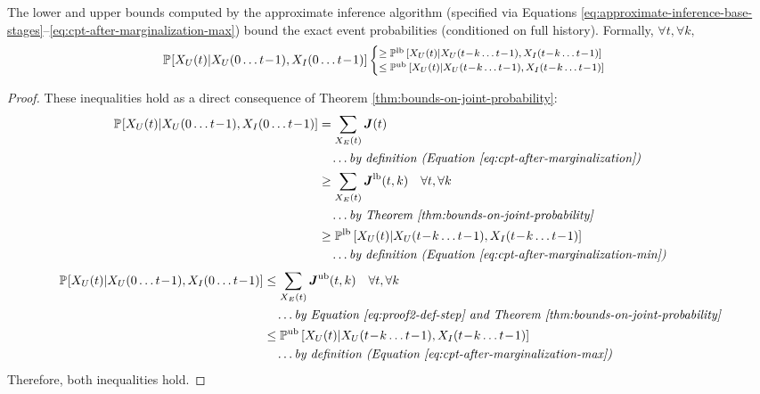 \documentclass[10pt]{article}
\newcommand{\PP}[2][]{\mathbb{P\!}_{#1}\left[#2\right]}
\newcommand{\PPlb}[2][]{\mathbb{P}^\text{lb}_{#1}\left[#2\right]}
\newcommand{\PPub}[2][]{\mathbb{P}^\text{ub}_{#1}\left[#2\right]}
\begin{document}
\begin{theorem}
The lower and upper bounds computed by the approximate inference algorithm (specified via Equations \ref{eq:approximate-inference-base-stages}--\ref{eq:cpt-after-marginalization-max}) bound the exact event probabilities (conditioned on full history).  Formally,
$\forall t,\forall k,$
\begin{equation*}
\footnotesize
  \PP{X_{U}(t)|X_{U}(0\ldots t\!-\!1),X_{I}(0\ldots t\!-\!1)}
\begin{cases}
\geq \PPlb{X_{U}(t)|X_{U}(t\!-\!k\ldots t\!-\!1),X_{I}(t\!-\!k\ldots t\!-\!1)}\\
\leq \PPub{X_{U}(t)|X_{U}(t\!-\!k\ldots t\!-\!1),X_{I}(t\!-\!k\ldots t\!-\!1)} 
\end{cases}
\end{equation*}
\end{theorem}
\begin{proof} These inequalities hold as a direct consequence of Theorem \ref{thm:bounds-on-joint-probability}:
{
\small
\begin{align}
\PP{X_{U}(t)|X_{U}(0\ldots t\!-\!1),X_{I}(0\ldots t\!-\!1)} 
&= 
\sum_{X_{E}(t)} 
\boldsymbol{J}(t)
\label{eq:proof2-def-step}\\
&\quad\ldots\textit{by definition (Equation \ref{eq:cpt-after-marginalization})}\nonumber\\
&\geq 
\sum_{X_{E}(t)} 
\boldsymbol{J}^\text{lb}(t,k)\quad\forall t,\forall k\\
&\quad\ldots\textit{by Theorem \ref{thm:bounds-on-joint-probability}}\nonumber\\
&\geq 
\PPlb{X_{U}(t)|X_{U}(t\!-\!k\ldots t\!-\!1),X_{I}(t\!-\!k\ldots t\!-\!1)}\nonumber\\
&\quad\ldots\textit{by definition (Equation \ref{eq:cpt-after-marginalization-min})}
\end{align}
\begin{align}
\PP{X_{U}(t)|X_{U}(0\ldots t\!-\!1),X_{I}(0\ldots t\!-\!1)} 
&\leq 
\sum_{X_{E}(t)} 
\boldsymbol{J}^\text{ub}(t,k)\quad\forall t,\forall k\\
&\quad\ldots\textit{by Equation \ref{eq:proof2-def-step} and Theorem \ref{thm:bounds-on-joint-probability}}\nonumber\\
&\leq 
\PPub{X_{U}(t)|X_{U}(t\!-\!k\ldots t\!-\!1),X_{I}(t\!-\!k\ldots t\!-\!1)}\nonumber\\
&\quad\ldots\textit{by definition (Equation \ref{eq:cpt-after-marginalization-max})}
\end{align}
}
Therefore, both inequalities hold.
\end{proof}
\end{document}
